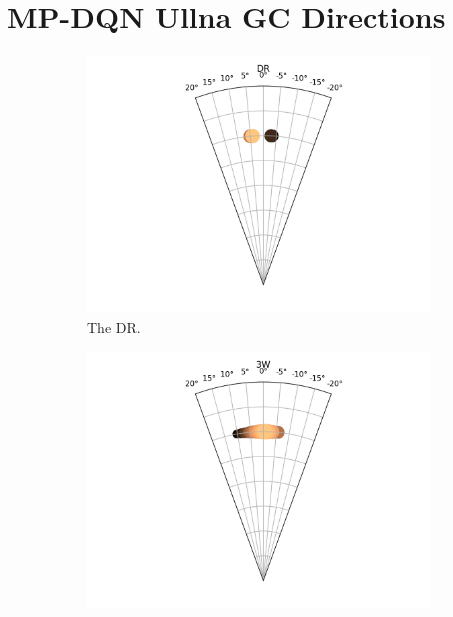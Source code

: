 \documentclass{kththesis}
\begin{document}
\chapter{MP-DQN Ullna GC Directions}
\label{app:mpdqn_ullna_direction_choices}
\begin{figure}
    \centering
    \begin{subfigure}{0.4\textwidth}
    \centering
    \includegraphics[width=\textwidth]{AgentDirectionChoices/MPDQN_Ullna_Direction_Choices_DR.png} 
    \caption{The DR.}
    \label{fig:DR_ullna_deviation}
    \end{subfigure}
    \begin{subfigure}{0.4\textwidth}
    \centering
    \includegraphics[width=\textwidth]{AgentDirectionChoices/MPDQN_Ullna_Direction_Choices_3W.png} 

\end{subfigure}
\end{figure}
\end{document}
